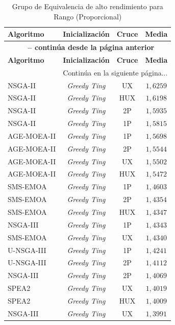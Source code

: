 \begin{longtable}{lccc}
    \caption{Grupo de Equivalencia de alto rendimiento para Rango (Proporcional)}
    \label{tab:elite_range_prop} \\
    \toprule
    \textbf{Algoritmo} & \textbf{Inicialización} & \textbf{Cruce} & \textbf{Media} \\
    \midrule
    \endfirsthead
    \multicolumn{4}{c}{{\bfseries \tablename\ \thetable{} -- continúa desde la página anterior}} \\
    \toprule
    \textbf{Algoritmo} & \textbf{Inicialización} & \textbf{Cruce} & \textbf{Media} \\
    \midrule
    \endhead
    \midrule \multicolumn{4}{r}{{Continúa en la siguiente página...}} \\
    \endfoot
    \bottomrule
    \endlastfoot
    NSGA-II & \textit{Greedy Ting} & UX & $1{,}6259$ \\
NSGA-II & \textit{Greedy Ting} & HUX & $1{,}6198$ \\
NSGA-II & \textit{Greedy Ting} & 2P & $1{,}5935$ \\
NSGA-II & \textit{Greedy Ting} & 1P & $1{,}5815$ \\
AGE-MOEA-II & \textit{Greedy Ting} & 1P & $1{,}5698$ \\
AGE-MOEA-II & \textit{Greedy Ting} & 2P & $1{,}5544$ \\
AGE-MOEA-II & \textit{Greedy Ting} & UX & $1{,}5502$ \\
AGE-MOEA-II & \textit{Greedy Ting} & HUX & $1{,}5472$ \\
SMS-EMOA & \textit{Greedy Ting} & 1P & $1{,}4603$ \\
SMS-EMOA & \textit{Greedy Ting} & 2P & $1{,}4354$ \\
SMS-EMOA & \textit{Greedy Ting} & HUX & $1{,}4347$ \\
NSGA-III & \textit{Greedy Ting} & 1P & $1{,}4343$ \\
SMS-EMOA & \textit{Greedy Ting} & UX & $1{,}4340$ \\
U-NSGA-III & \textit{Greedy Ting} & 1P & $1{,}4241$ \\
U-NSGA-III & \textit{Greedy Ting} & 2P & $1{,}4112$ \\
NSGA-III & \textit{Greedy Ting} & 2P & $1{,}4069$ \\
SPEA2 & \textit{Greedy Ting} & UX & $1{,}4019$ \\
SPEA2 & \textit{Greedy Ting} & HUX & $1{,}4009$ \\
NSGA-III & \textit{Greedy Ting} & UX & $1{,}3991$ \\

\end{longtable}
